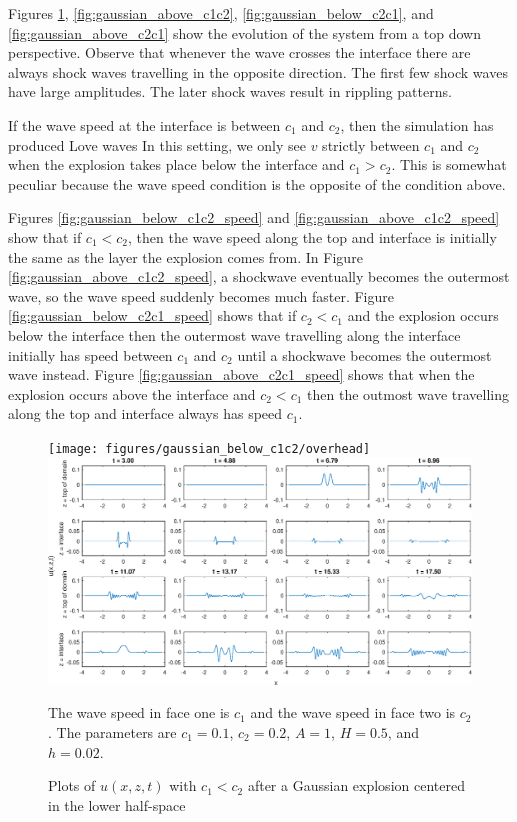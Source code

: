 \documentclass[11pt,letter,subeqn,fleqn]{article}
\numberwithin{equation}{section}
\numberwithin{table}{section}
\numberwithin{figure}{section}
\begin{document}
Figures \ref{fig:gaussian_below_c1c2}, \ref{fig:gaussian_above_c1c2}, \ref{fig:gaussian_below_c2c1}, and \ref{fig:gaussian_above_c2c1}
show the evolution of the system from a top down perspective. Observe that whenever the wave crosses the interface there are always
shock waves travelling in the opposite direction. The first few shock waves have large amplitudes. The later shock waves
result in rippling patterns.

If the wave speed at the interface is between $c_1$ and $c_2$, then the simulation has produced Love waves 
In this setting, we only see $v$ strictly between $c_1$ and $c_2$ when the explosion takes place
below the interface and $c_1>c_2$. This is somewhat peculiar because the wave speed condition is the opposite of
the condition above.

Figures \ref{fig:gaussian_below_c1c2_speed} and \ref{fig:gaussian_above_c1c2_speed} show that if
$c_1<c_2$, then the wave speed along the top and interface is initially the same as the layer the explosion comes
from. In Figure \ref{fig:gaussian_above_c1c2_speed}, a shockwave eventually becomes the outermost wave, so the
wave speed suddenly becomes much faster. Figure \ref{fig:gaussian_below_c2c1_speed} shows that if $c_2<c_1$ and
the explosion occurs below the interface then the outermost wave travelling along the interface initially has 
speed between $c_1$ and $c_2$ until a shockwave becomes the outermost wave instead. Figure \ref{fig:gaussian_above_c2c1_speed}
shows that when the explosion occurs above the interface and $c_2<c_1$ then the outmost wave travelling along the
top and interface always has speed $c_1$.

\begin{figure}[htbp]
	\caption{Plots of $u(x,z,t)$ with $c_1<c_2$ after a Gaussian explosion centered in the lower half-space}
	\label{fig:gaussian_below_c1c2}
	\texttt{[image: figures/gaussian\_below\_c1c2/overhead]}
	\includegraphics[width=\linewidth]{figures/gaussian_below_c1c2/u_inter_boundary}
\footnotesize
\centering

The wave speed in face one is $c_1$ and the wave speed in face two is $c_2$. The parameters are $c_1 = 0.1$, $c_2 = 0.2$, $A=1$, $H=0.5$, and $h = 0.02$.
\end{figure}
\end{document}
